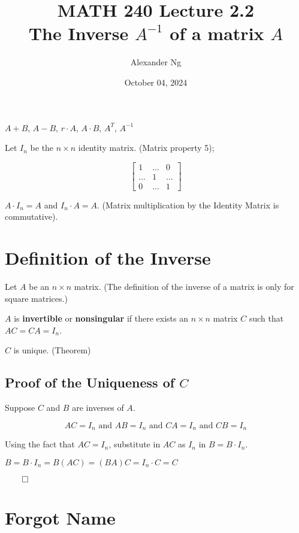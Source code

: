 \documentclass[12pt]{article}
\begin{document}
\renewcommand{\arraystretch}{1.25} %
\setlength{\arraycolsep}{12pt} 

\title{MATH 240 Lecture 2.2\\The Inverse $A^{-1}$ of a matrix $A$}
\author{Alexander Ng}
\date{October 04, 2024}

\maketitle

$A+B$, $A-B$, $r \cdot A$, $A\cdot B$, $A^T$, $A^{-1}$

Let $I_n$ be the $n \times n$ identity matrix. (Matrix property 5);

\[
  \begin{bmatrix}
    1 & ... & 0 \\
    ... & 1 & ... \\
    0 & ... & 1
  \end{bmatrix}
\]

$A \cdot I_n = A$ and $I_n \cdot A = A$. (Matrix multiplication by the Identity
Matrix is commutative).

\section{Definition of the Inverse}

Let $A$ be an $n \times n$ matrix. (The definition of the inverse of a matrix is
only for square matrices.)

$A$ is \textbf{invertible} or \textbf{nonsingular} if there exists an $n \times n$
matrix $C$ such that $AC = CA = I_n$.

$C$ is unique. (Theorem)

\subsection{Proof of the Uniqueness of $C$}

Suppose $C$ and $B$ are inverses of $A$.

\[
  AC = I_n \text{ and } AB = I_n \text{ and } CA = I_n \text{ and } CB = I_n
\]

Using the fact that $AC = I_n$, substitute in $AC$ as $I_n$ in $B = B \cdot I_n$.

$B = B \cdot I_n = B(AC) = (BA)C = I_n \cdot C = C$

$\qed$

\section{Forgot Name}
\end{document}
